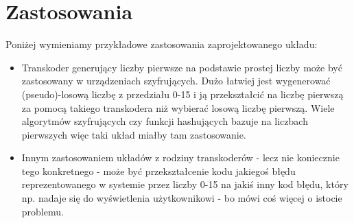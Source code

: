 \documentclass[a4paper]{article}
\begin{document}
\section{Zastosowania}
Poniżej wymieniamy przykładowe zastosowania zaprojektowanego układu:
\begin{itemize}
  \item Transkoder generujący liczby pierwsze na podstawie prostej liczby może być zastosowany w urządzeniach 
      szyfrujących. Dużo łatwiej jest wygenerować (pseudo)-losową liczbę z przedziału 0-15 i ją przekształcić na
      liczbę pierwszą za pomocą takiego transkodera niż wybierać losową liczbę pierwszą. Wiele algorytmów szyfrujących
      czy funkcji hashujących bazuje na liczbach pierwszych więc taki układ miałby tam zastosowanie.
  \item Innym zastosowaniem układów z rodziny transkoderów - lecz nie koniecznie tego konkretnego - może być 
      przekształcenie kodu jakiegoś błędu reprezentowanego w systemie przez liczby 0-15 na jakiś inny kod błędu, 
      który np. nadaje się do wyświetlenia użytkownikowi - bo mówi coś więcej o istocie problemu.
\end{itemize}
\end{document}
